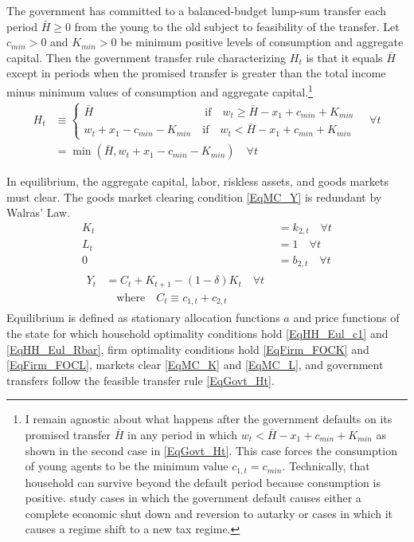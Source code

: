 \documentclass[letterpaper,12pt]{article}
\theoremstyle{definition}
\begin{document}
  The government has committed to a balanced-budget lump-sum transfer each period $\bar{H}\geq 0$ from the young to the old subject to feasibility of the transfer. Let $c_{min}>0$ and $K_{min}>0$ be minimum positive levels of consumption and aggregate capital. Then the government transfer rule characterizing $H_t$ is that it equals $\bar{H}$ except in periods when the promised transfer is greater than the total income minus minimum values of consumption and aggregate capital.\footnote{I remain agnostic about what happens after the government defaults on its promised transfer $\bar{H}$ in any period in which $w_t < \bar{H} - x_1 + c_{min} + K_{min}$ as shown in the second case in \eqref{EqGovt_Ht}. This case forces the consumption of young agents to be the minimum value $c_{1,t}=c_{min}$. Technically, that household can survive beyond the default period because consumption is positive. \citet{EvansEtAl:2013} study cases in which the government default causes either a complete economic shut down and reversion to autarky or cases in which it causes a regime shift to a new tax regime.}
  \begin{equation}\label{EqGovt_Ht}
    \begin{split}
      H_t &\equiv
        \begin{cases}
          \bar{H} \qquad\qquad\qquad\qquad\qquad\text{if}\quad w_t \geq \bar{H} - x_1 + c_{min} + K_{min} \\
          w_t + x_1 - c_{min} - K_{min} \quad\text{if}\quad w_t < \bar{H} - x_1 + c_{min} + K_{min}
        \end{cases} \quad\forall t \\
        &= \min\left(\bar{H}, w_t + x_1 - c_{min} - K_{min}\right) \quad\forall t
    \end{split}
  \end{equation}

  In equilibrium, the aggregate capital, labor, riskless assets, and goods markets must clear. The goods market clearing condition \eqref{EqMC_Y} is redundant by Walras' Law.
  \begin{align}
    K_t &= k_{2,t} \quad\forall t \label{EqMC_K} \\
    L_t &= 1 \quad\forall t \label{EqMC_L} \\
    0 &= b_{2,t} \quad\forall t \label{EqMC_B} \\
    \begin{split}
      Y_t &= C_t + K_{t+1} - (1-\delta)K_t \quad\forall t \\
      &\quad\text{where}\quad C_t\equiv c_{1,t} + c_{2,t}
    \end{split} \label{EqMC_Y}
  \end{align}
  Equilibrium is defined as stationary allocation functions $a$ and price functions of the state for which household optimality conditions hold \eqref{EqHH_Eul_c1} and \eqref{EqHH_Eul_Rbar}, firm optimality conditions hold \eqref{EqFirm_FOCK} and \eqref{EqFirm_FOCL}, markets clear \eqref{EqMC_K} and \eqref{EqMC_L}, and government transfers follow the feasible transfer rule \eqref{EqGovt_Ht}.
\end{document}
